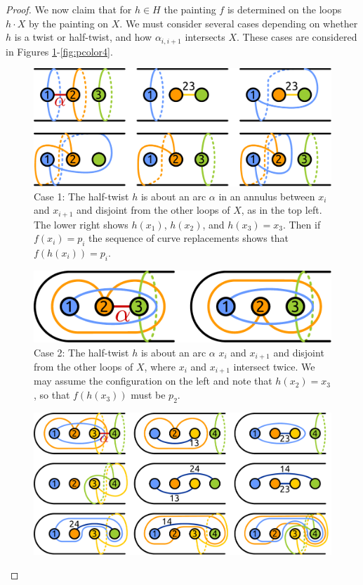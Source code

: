 \documentclass[11pt]{article}
\theoremstyle{remark}
\theoremstyle{definition}
\begin{document}
\begin{proof}
  We now claim that for $h \in H$ the
  painting $f$ is determined on the loops $h\cdot X$
  by the painting on $X$.
  We must consider several cases
  depending on whether $h$ is a twist or half-twist,
  and how $\alpha_{i,i+1}$ intersects $X$.
  These cases are considered in Figures \ref{fig:pcolor1}-\ref{fig:pcolor4}.
    \begin{figure}[h!]
      \includegraphics[width=.7\textwidth]{figures/pcolorsequence1.pdf}
      \caption{Case 1: The half-twist $h$ is about an arc $\alpha$
      in an annulus between $x_i$ and $x_{i+1}$ and disjoint from the other loops of $X$,
      as in the top left.
      The lower right shows $h(x_1)$, $h(x_2)$, and $h(x_3)=x_3$.
      Then if $f(x_i)=p_i$ the sequence of curve replacements shows
      that $f(h(x_i))=p_i$.
      }
      \label{fig:pcolor1}
    \end{figure}
    \begin{figure}[h!]
      \includegraphics[width=.5\textwidth]{figures/pcolorsequence2.pdf}
      \caption{Case 2: The half-twist $h$ is about an arc $\alpha$
      $x_i$ and $x_{i+1}$ and disjoint from the other loops of $X$,
      where $x_i$ and $x_{i+1}$ intersect twice.
      We may assume the configuration on the left and note that
      $h(x_2)=x_3$, so that $f(h(x_3))$ must be $p_2$.}
      \label{fig:pcolor2}
    \end{figure}
    \begin{figure}[h!]
      \includegraphics[width=.8\textwidth]{figures/pcolorsequence3.pdf}

\end{figure}
\end{proof}
\end{document}
